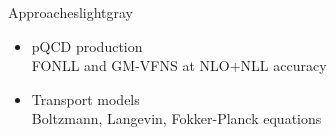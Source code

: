 \documentclass[aspectratio=169,11pt,usenames,dvipsnames]{beamer}
\begin{document}
\begin{frame}
    \begin{columns}[onlytextwidth,t]
            \vspace{-20pt}
            \begin{center}
            \end{center}
        \vspace{0pt}
        \begin{center}
            \begin{custombox2}{\color{normal}Approaches}{lightgray}
                \small
                \begin{varwidth}{0.85\textwidth}
                \begin{itemize}\itemsep0em 
                    \item pQCD production\\[1pt]
                        {\color{lightgray}\scriptsize FONLL and GM-VFNS at NLO+NLL accuracy}
                    \item Transport models\\[1pt]
                        {\color{lightgray}\scriptsize Boltzmann, Langevin, Fokker-Planck equations}

\end{itemize}
\end{varwidth}
\end{custombox2}
\end{center}
\end{columns}
\end{frame}
\end{document}
